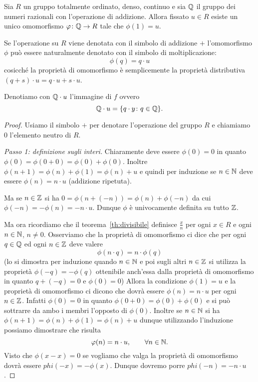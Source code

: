 \begin{lemma}
Sia $R$ un gruppo totalmente ordinato, denso, continuo e 
sia ${\mathbb Q}$ il gruppo dei numeri razionali con l'operazione 
di addizione.
Allora fissato $u\in R$ esiste un unico omomorfismo $\varphi\colon {\mathbb Q} \to R$ tale che $\phi(1)=u$.

Se l'operazione su $R$ viene denotata con il simbolo di addizione $+$ 
l'omomorfismo $\phi$ può essere naturalmente denotato con il simbolo di moltiplicazione:
\[
   \phi(q) = q\cdot u
\]
cosicché la proprietà di omomorfismo è semplicemente la proprietà distributiva 
$(q+s)\cdot u = q\cdot u + s\cdot u$.

Denotiamo con ${\mathbb Q}\cdot u$ l'immagine di $f$ ovvero
\[
  {\mathbb Q} \cdot u = {\left\{ q\cdot y \colon q\in {\mathbb Q} \right\}}.
\] 
\end{lemma}
%
\begin{proof}
Usiamo il simbolo $+$ per denotare l'operazione del gruppo $R$ e chiamiamo $0$ 
l'elemento neutro di $R$.

\emph{Passo 1: definizione sugli interi.}
Chiaramente deve essere $\phi(0)=0$ in quanto $\phi(0) = \phi(0+0) = \phi(0)+\phi(0)$.
Inoltre $\phi(n+1) = \phi(n)+\phi(1) = \phi(n) + u$ e quindi per induzione
se $n\in {\mathbb N}$ deve essere $\phi(n) = n\cdot u$ (addizione ripetuta).

Ma se $n\in {\mathbb Z}$ si ha $0=\phi(n+(-n)) = \phi(n)+\phi(-n)$ da cui 
$\phi(-n) = -\phi(n) = - n\cdot u$.
Dunque $\phi$ è univocamente definita su tutto ${\mathbb Z}$.

Ma ora ricordiamo che il teorema~\ref{th:divisibile} definisce $\frac{x}{n}$ 
per ogni $x\in R$ e ogni $n\in {\mathbb N}$, $n\neq 0$. 
Osserviamo che la proprietà di omomorfismo ci dice che per ogni $q\in {\mathbb Q}$ 
ed ogni $n\in {\mathbb Z}$ deve valere 
\[
  \phi(n\cdot q) = n \cdot \phi(q)  
\]
(lo si dimostra per induzione quando $n\in {\mathbb N}$ e poi sugli altri $n\in {\mathbb Z}$ 
si utilizza la proprietà $\phi(-q) = -\phi(q)$ ottenibile anch'essa dalla proprietà 
di omomorfismo in quanto $q+(-q)=0$ e $\phi(0)=0$)
Allora la condizione $\phi(1)=u$ e la proprietà di omomorfismo ci dicono che 
dovrà essere $\phi(n) = n\cdot u$ per ogni $n\in {\mathbb Z}$.
Infatti $\phi(0) = 0$ in quanto $\phi(0+0)=\phi(0)+\phi(0)$
e si può sottrarre da ambo i membri l'opposto di $\phi(0)$.
Inoltre se $n\in {\mathbb N}$ si ha $\phi(n+1)=\phi(n)+\phi(1)=\phi(n)+u$
dunque utilizzando l'induzione possiamo dimostrare 
che risulta 
\[
   \varphi(n) = n\cdot u, \qquad \forall n\in {\mathbb N}.
\]
Visto che $\phi(x-x)=0$ se vogliamo che valga la proprietà di omomorfismo
dovrà essere $phi(-x) = -\phi(x)$.
Dunque dovremo porre $phi(-n) = -n\cdot u$.


\end{proof}

